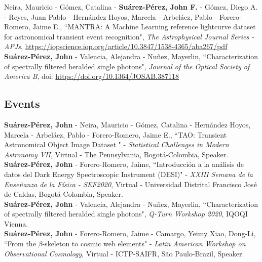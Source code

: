 \documentclass[10pt, a4paper]{article}
\newcommand{\years}[1]{\marginnote{\scriptsize #1}}
\begin{document}
\years{2020}Neira, Mauricio - Gómez, Catalina - \textbf{Suárez-Pérez, John F.} - Gómez, Diego A. - Reyes, Juan Pablo - Hernández Hoyos, Marcela - Arbeláez, Pablo - Forero-Romero, Jaime E., “MANTRA: A Machine Learning reference lightcurve dataset for astronomical transient event recognition", \emph{The Astrophysical Journal Series - APJs}, \url{https://iopscience.iop.org/article/10.3847/1538-4365/aba267/pdf} 
\\

\years{2020}\textbf{Suárez-Pérez, John} - Valencia, Alejandra - Nuñez, Mayerlin, “Characterization of spectrally filtered heralded single photons", \emph{Journal of the Optical Society of America B}, doi: \url{https://doi.org/10.1364/JOSAB.387118}

\subsection*{Events}
\noindent
\years{2021}\textbf{Suárez-Pérez, John} - Neira, Mauricio - Gómez, Catalina - Hernández Hoyos, Marcela - Arbeláez, Pablo - Forero-Romero, Jaime E., “TAO: Transient Astronomical Object Image Dataset  " - \emph{Statistical Challenges in Modern Astronomy VII}, Virtual - The Pennsylvania, Bogotá-Colombia, Speaker.\\

\years{2020}\textbf{Suárez-Pérez, John} - Forero-Romero, Jaime, “Introducción a la análisis de datos del Dark Energy Spectroscopic Instrument (DESI)" - \emph{XXIII Semana de la Enseñanza de la Física - SEF2020}, Virtual - Universidad Distrital Francisco José de Caldas, Bogotá-Colombia, Speaker.\\

\years{2020}\textbf{Suárez-Pérez, John} - Valencia, Alejandra - Nuñez, Mayerlin, “Characterization of spectrally filtered heralded single photons", \emph{Q-Turn Workshop 2020}, IQOQI Vienna.\\

\years{2020}\textbf{Suárez-Pérez, John} - Forero-Romero, Jaime - Camargo, Yeimy  Xiao, Dong-Li, “From the $\beta$-skeleton to cosmic web elements" - \emph{Latin American Workshop on Observational Cosmology}, Virtual - ICTP-SAIFR, São Paulo-Brazil, Speaker.\\

\end{document}
